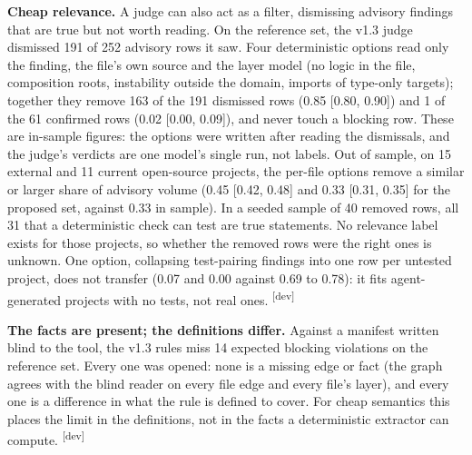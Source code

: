 \documentclass[10pt,a4paper]{article}
\newcommand{\devset}{\textsuperscript{\textsf{\tiny[dev]}}}
\begin{document}
\textbf{Cheap relevance.} A judge can also act as a filter, dismissing advisory findings that are true but not
worth reading. On the reference set, the v1.3 judge dismissed 191 of 252 advisory rows it saw. Four deterministic
options read only the finding, the file's own source and the layer model (no logic in the file, composition roots,
instability outside the domain, imports of type-only targets); together they remove 163 of the 191 dismissed rows
(0.85 [0.80, 0.90]) and 1 of the 61 confirmed rows (0.02 [0.00, 0.09]), and never touch a blocking row. These are
in-sample figures: the options were written after reading the dismissals, and the judge's verdicts are one model's
single run, not labels. Out of sample, on 15 external and 11 current open-source projects, the per-file options remove
a similar or larger share of advisory volume (0.45 [0.42, 0.48] and 0.33 [0.31, 0.35] for the proposed set, against
0.33 in sample). In a seeded sample of 40 removed rows, all 31 that a deterministic check can test are true
statements. No relevance label
exists for those projects, so whether the removed rows were the right ones is unknown. One option, collapsing
test-pairing findings into one row per untested project, does not transfer (0.07 and 0.00 against 0.69 to 0.78):
it fits agent-generated projects with no tests, not real ones. \devset{}

\textbf{The facts are present; the definitions differ.} Against a manifest written blind to the tool, the v1.3
rules miss 14 expected blocking violations on the reference set. Every one was opened: none is a missing edge or
fact (the graph agrees with the blind reader on every file edge and every file's layer), and every one is a
difference in what the rule is defined to cover. For cheap semantics this places the limit in the definitions, not
in the facts a deterministic extractor can compute. \devset{}
\end{document}
